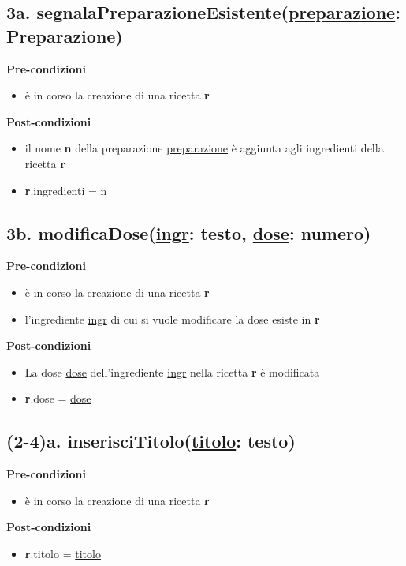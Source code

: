 \documentclass[12pt]{extarticle}
\begin{document}
\subsection*{3a. segnalaPreparazioneEsistente(\underline{preparazione}: Preparazione)}

\textbf{Pre-condizioni}
\begin{itemize}
  \item è in corso la creazione di una ricetta  \textbf{r}
\end{itemize}
\textbf{Post-condizioni}
\begin{itemize}
  \item il nome \textbf{n} della preparazione \underline{preparazione} è aggiunta agli ingredienti della ricetta  \textbf{r}
  \item \textbf{r}.ingredienti = n
\end{itemize}

\subsection*{3b. modificaDose(\underline{ingr}: testo, \underline{dose}: numero)}

\textbf{Pre-condizioni}
\begin{itemize}
  \item è in corso la creazione di una ricetta \textbf{r}
  \item l'ingrediente \underline{ingr} di cui si vuole modificare la dose esiste in \textbf{r}
\end{itemize}
\textbf{Post-condizioni}
\begin{itemize}
  \item La dose \underline{dose} dell'ingrediente \underline{ingr} nella ricetta \textbf{r} è modificata
  \item \textbf{r}.dose = \underline{dose}
\end{itemize}

\subsection*{(2-4)a. inserisciTitolo(\underline{titolo}: testo)}

\textbf{Pre-condizioni}
\begin{itemize}
  \item è in corso la creazione di una ricetta  \textbf{r}
\end{itemize}
\textbf{Post-condizioni}
\begin{itemize}
  \item \textbf{r}.titolo = \underline{titolo}
\end{itemize}
\end{document}
